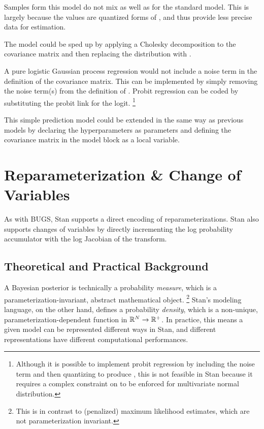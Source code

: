 Samples form this model do not mix as well as for the standard model.
This is largely because the  values are quantized forms of
, and thus provide less precise data for estimation.  

The model could be sped up by applying a Cholesky decomposition to the
covariance matrix  and then replacing the
 distribution with .

A pure logistic Gaussian process regression would not include a noise
term in the definition of the covariance matrix.  This can be
implemented by simply removing the noise term(s)  from
the definition of .  Probit regression can be coded by
substituting the probit link for the logit.%
%
\footnote{Although it is possible to implement probit regression by
  including the noise term  and then quantizing
   to produce , this is not feasible in Stan
  because it requires a complex constraint on  to be enforced
  for multivariate normal distribution.}

This simple prediction model could be extended in the same way as
previous models by declaring the hyperparameters as parameters and
defining the covariance matrix in the model block as a local variable.





\chapter{Reparameterization \& Change of Variables}\label{change-of-variables.chapter}

\noindent
As with BUGS, Stan supports a direct encoding of reparameterizations.
Stan also supports changes of variables by directly incrementing the
log probability accumulator with the log Jacobian of the transform.

\section{Theoretical and Practical Background}

A Bayesian posterior is technically a probability \emph{measure},
which is a parameterization-invariant, abstract mathematical object.%
%
\footnote{This is in contrast to (penalized) maximum likelihood
  estimates, which are not parameterization invariant.}
%
Stan's modeling language, on the other hand, defines a probability
\emph{density}, which is a non-unique, parameterization-dependent
function in $\reals^N \rightarrow \reals^{+}$.  In practice, this
means a given model can be represented different ways in Stan, and
different representations have different computational performances.

